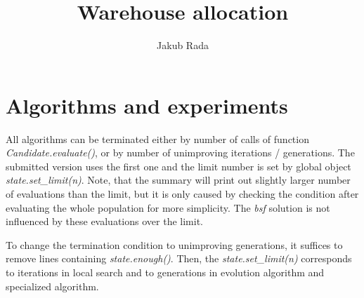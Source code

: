 \documentclass[a4paper, 12pt]{article}
\title{Warehouse allocation}
\author{Jakub Rada}
\date{}
\begin{document}
\maketitle
\pagebreak



\section{Algorithms and experiments}

All algorithms can be terminated either by number of calls of function \textit{Candidate.evaluate()}, or by number of unimproving iterations / generations.
The submitted version uses the first one and the limit number is set by global object \textit{state.set\_limit(n)}.
Note, that the summary will print out slightly larger number of evaluations than the limit, but it is only caused by checking the condition after evaluating the whole population for more simplicity.
The \textit{bsf} solution is not influenced by these evaluations over the limit.

To change the termination condition to unimproving generations, it suffices to remove lines containing \textit{state.enough()}.
Then, the \textit{state.set\_limit(n)} corresponds to iterations in local search and to generations in evolution algorithm and specialized algorithm.



\newpage



\newpage



\newpage



\newpage


\end{document}
